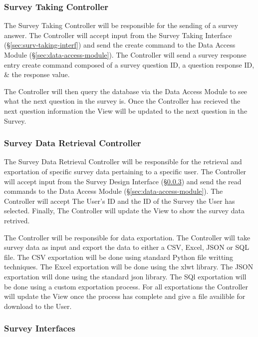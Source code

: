 \documentclass{article}
\begin{document}
\subsubsection{Survey Taking Controller}
\label{sec:survey-taking}

The Survey Taking Controller will be responsible for the sending of a
survey answer.  The Controller will accept input from the
Survey Taking Interface (\S\ref{sec:surv-taking-interf}) and send the create command to the
Data Access Module (\S\ref{sec:data-access-module}).  The Controller will send a
survey response entry create command composed of a survey
question ID, a question response ID, \& the response value.

The Controller will then query the database via the
Data Access Module to see what the next question in the
survey is.  Once the Controller has recieved the next question
information the View will be updated to the next question in the
Survey.

\subsubsection{Survey Data Retrieval Controller}
\label{sec:surv-data-retr}

The Survey Data Retrieval Controller will be responsible for the
retrieval and exportation of specific survey data pertaining to a
specific user.  The Controller will accept input from the
Survey Design Interface (\S\ref{sec:surv-design-interf}) and send the read commands to the
Data Access Module (\S\ref{sec:data-access-module}).  The Controller will accept The User's
ID and the ID of the Survey the User has selected.  Finally, The
Controller will update the View to show the survey data retrived.

The Controller will be responsible for data exportation.  The
Controller will take survey data as input and export the data to
either a CSV, Excel, JSON or SQL file.  The CSV exportation will be done
using standard Python file writting techniques.  The Excel exportation
will be done using the xlwt library.  The JSON exportation will done
using the standard json library.  The SQl exportation will be done
using a custom exportation process.  For all exportations the
Controller will update the View once the process has complete and give
a file availible for download to the User.

\subsubsection{Survey Interfaces}
\label{sec:surv-design-interf}
\end{document}
